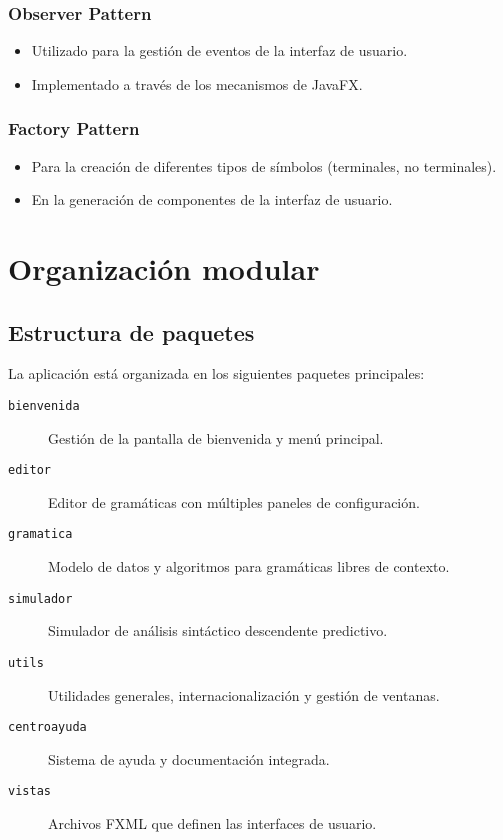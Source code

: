 \subsubsection{Observer Pattern}
\begin{itemize}
    \item Utilizado para la gestión de eventos de la interfaz de usuario.
    \item Implementado a través de los mecanismos de JavaFX.
\end{itemize}

\subsubsection{Factory Pattern}
\begin{itemize}
    \item Para la creación de diferentes tipos de símbolos (terminales, no terminales).
    \item En la generación de componentes de la interfaz de usuario.
\end{itemize}

\section{Organización modular}

\subsection{Estructura de paquetes}

La aplicación está organizada en los siguientes paquetes principales:

\begin{description}
    \item[\texttt{bienvenida}] Gestión de la pantalla de bienvenida y menú principal.
    \item[\texttt{editor}] Editor de gramáticas con múltiples paneles de configuración. 
    \item[\texttt{gramatica}] Modelo de datos y algoritmos para gramáticas libres de contexto.
    \item[\texttt{simulador}] Simulador de análisis sintáctico descendente predictivo.
    \item[\texttt{utils}] Utilidades generales, internacionalización y gestión de ventanas.
    \item[\texttt{centroayuda}] Sistema de ayuda y documentación integrada.
    \item[\texttt{vistas}] Archivos FXML que definen las interfaces de usuario.
\end{description}

